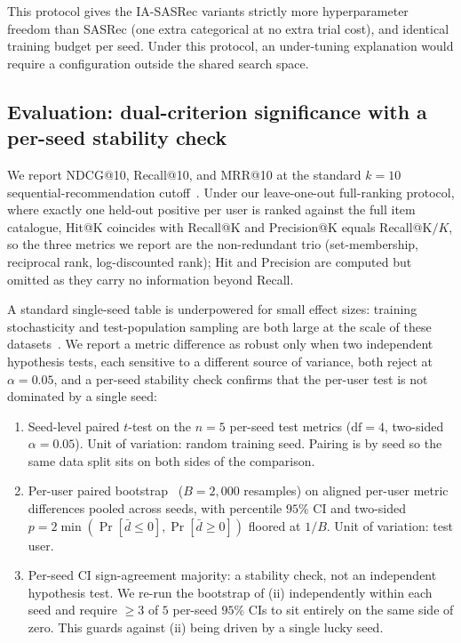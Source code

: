 This protocol gives the IA-SASRec variants strictly more
hyperparameter freedom than SASRec (one extra categorical at no extra
trial cost), and identical training budget per seed. Under this
protocol, an under-tuning explanation would require a configuration
outside the shared search space.

\subsection{Evaluation: dual-criterion significance with a per-seed stability check}
\label{sec:setup:eval}

We report NDCG@10, Recall@10, and MRR@10 at the standard $k{=}10$
sequential-recommendation cutoff~\citep{kang2018sasrec,sun2019bert4rec}.
Under our leave-one-out full-ranking protocol, where exactly one held-out
positive per user is ranked against the full item catalogue, Hit@K
coincides with Recall@K and Precision@K equals Recall@K$/K$, so the
three metrics we report are the non-redundant trio (set-membership,
reciprocal rank, log-discounted rank); Hit and Precision are computed
but omitted as they carry no information beyond Recall.

A standard single-seed table is underpowered for small effect sizes:
training stochasticity and test-population sampling are both large at
the scale of these datasets~\citep{ferrari2019,sun2020daisy}. We
report a metric difference as robust only when two independent
hypothesis tests, each sensitive to a different source of variance,
both reject at $\alpha{=}0.05$, and a per-seed stability check
confirms that the per-user test is not dominated by a single seed:

\begin{enumerate}
\item[(i)] Seed-level paired $t$-test on the $n{=}5$ per-seed
test metrics ($\mathrm{df}{=}4$, two-sided $\alpha{=}0.05$). Unit of
variation: random training seed. Pairing is by seed so the same
data split sits on both sides of the comparison.
\item[(ii)] Per-user paired bootstrap~\citep{efron1993bootstrap} ($B{=}2{,}000$ resamples)
on aligned per-user metric differences pooled across seeds, with
percentile $95\%$ CI and two-sided $p = 2 \min(\Pr[\bar d{\le}0], \Pr[\bar d{\ge}0])$
floored at $1/B$. Unit of variation: test user.
\item[(iii)] Per-seed CI sign-agreement majority: a stability
check, not an independent hypothesis test. We re-run the bootstrap
of (ii) independently within each seed and require $\ge 3$ of $5$
per-seed $95\%$ CIs to sit entirely on the same side of zero. This
guards against (ii) being driven by a single lucky seed.
\end{enumerate}

